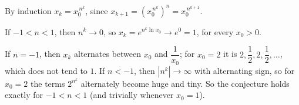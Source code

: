 By induction $x_k=x_0^{\,n^k}$, since $x_{k+1}=\left(x_0^{\,n^k}\right)^n=x_0^{\,n^{k+1}}$.

If $-1<n<1$, then $n^k\to0$, so $x_k=e^{n^k\ln x_0}\to e^0=1$, for every $x_0>0$.

If $n=-1$, then $x_k$ alternates between $x_0$ and $\dfrac{1}{x_0}$; for $x_0=2$ it is $2,\dfrac{1}{2},2,\dfrac{1}{2},\dots$, which does not tend to $1$. If $n<-1$, then $|n^k|\to\infty$ with alternating sign, so for $x_0=2$ the terms $2^{n^k}$ alternately become huge and tiny. So the conjecture holds exactly for $-1<n<1$ (and trivially whenever $x_0=1$).
